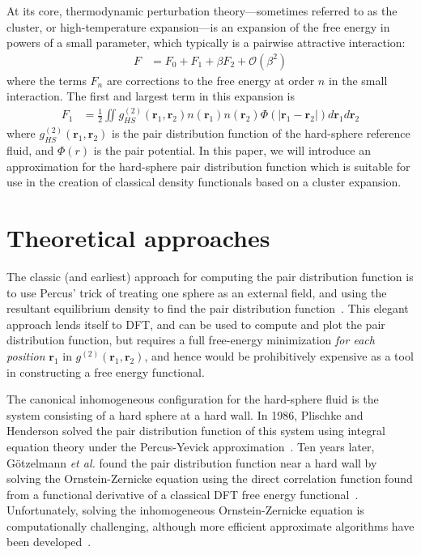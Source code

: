 \documentclass[letterpaper,twocolumn,amsmath,amssymb,pre,aps,10pt]{revtex4-1}
\newcommand{\rr}{\textbf{r}}
\begin{document}
At its core, thermodynamic perturbation theory---sometimes referred to
as the cluster, or high-temperature expansion---is an expansion of the
free energy in powers of a small parameter, which typically is a
pairwise attractive interaction:
\begin{align}
  F &= F_0 + F_1 + \beta F_2 + \mathcal{O}(\beta^2)
\end{align}
where the terms $F_n$ are corrections to the free energy at order $n$
in the small interaction.  The first and largest term in this
expansion is
\begin{align}
  F_1 &= \tfrac12 \iint
  g^{(2)}_{HS}(\rr_1,\rr_2)n(\rr_1)n(\rr_2)\Phi(|\rr_1-\rr_2|)
  d\rr_1d\rr_2
  \label{eq:mean-field}
\end{align}
where $g^{(2)}_{HS}(\rr_1,\rr_2)$ is the pair distribution function of
the hard-sphere reference fluid, and $\Phi(r)$ is the pair potential.
In this paper, we will introduce an approximation for the hard-sphere
pair distribution function which is suitable for use in the creation
of classical density functionals based on a cluster expansion.

\section{Theoretical approaches}

The classic (and earliest) approach for computing the pair
distribution function is to use Percus' trick of treating one sphere
as an external field, and using the resultant equilibrium density to
find the pair distribution function~\cite{hansen2006theory}.  This
elegant approach lends itself to DFT, and can be used to compute and
plot the pair distribution function, but requires a full free-energy
minimization \emph{for each position} $\rr_1$ in
$g^{(2)}(\rr_1,\rr_2)$, and hence would be prohibitively expensive as
a tool in constructing a free energy functional.

The canonical inhomogeneous configuration for the hard-sphere fluid is
the system consisting of a hard sphere at a hard wall.  In 1986,
Plischke and Henderson solved the pair distribution function of this
system using integral equation theory under the Percus-Yevick
approximation~\cite{plischke1986pair}.  Ten years later,
G{\"o}tzelmann \emph{et al.} found the pair distribution function near
a hard wall by solving the Ornstein-Zernicke equation using the direct
correlation function found from a functional derivative of a classical
DFT free energy functional~\cite{gotzelmann1996structure}.
Unfortunately, solving the inhomogeneous Ornstein-Zernicke equation is
computationally challenging, although more efficient approximate
algorithms have been developed~\cite{paul2003variational}.
\end{document}
